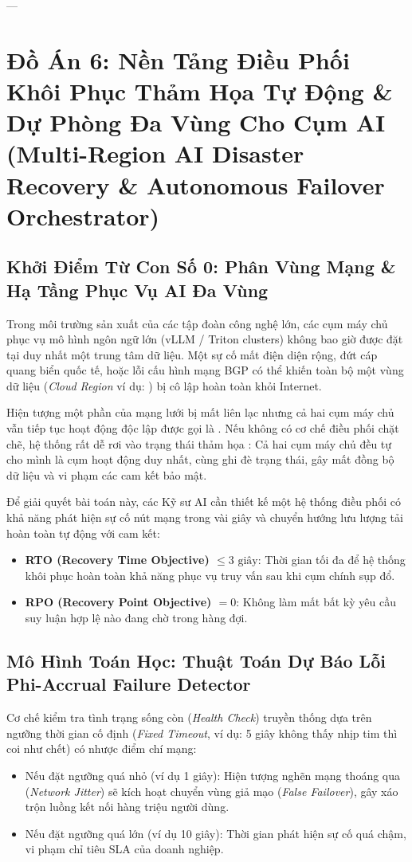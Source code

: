 ---

\section{Đồ Án 6: Nền Tảng Điều Phối Khôi Phục Thảm Họa Tự Động \& Dự Phòng Đa Vùng Cho Cụm AI (Multi-Region AI Disaster Recovery \& Autonomous Failover Orchestrator)}
\label{sec:workbook-multi-region-failover}

\subsection{Khởi Điểm Từ Con Số 0: Phân Vùng Mạng \& Hạ Tầng Phục Vụ AI Đa Vùng}
Trong môi trường sản xuất của các tập đoàn công nghệ lớn, các cụm máy chủ phục vụ mô hình ngôn ngữ lớn (vLLM / Triton clusters) không bao giờ được đặt tại duy nhất một trung tâm dữ liệu. Một sự cố mất điện diện rộng, đứt cáp quang biển quốc tế, hoặc lỗi cấu hình mạng BGP có thể khiến toàn bộ một vùng dữ liệu (\textit{Cloud Region} ví dụ: ) bị cô lập hoàn toàn khỏi Internet.

Hiện tượng một phần của mạng lưới bị mất liên lạc nhưng cả hai cụm máy chủ vẫn tiếp tục hoạt động độc lập được gọi là . Nếu không có cơ chế điều phối chặt chẽ, hệ thống rất dễ rơi vào trạng thái thảm họa : Cả hai cụm máy chủ đều tự cho mình là cụm hoạt động duy nhất, cùng ghi đè trạng thái, gây mất đồng bộ dữ liệu và vi phạm các cam kết bảo mật.

Để giải quyết bài toán này, các Kỹ sư AI cần thiết kế một hệ thống điều phối  có khả năng phát hiện sự cố nút mạng trong vài giây và chuyển hướng lưu lượng tải hoàn toàn tự động với cam kết:
\begin{itemize}
  \item \textbf{RTO (Recovery Time Objective) $\le 3\text{ giây}$}: Thời gian tối đa để hệ thống khôi phục hoàn toàn khả năng phục vụ truy vấn sau khi cụm chính sụp đổ.
  \item \textbf{RPO (Recovery Point Objective) $= 0$}: Không làm mất bất kỳ yêu cầu suy luận hợp lệ nào đang chờ trong hàng đợi.
\end{itemize}

\subsection{Mô Hình Toán Học: Thuật Toán Dự Báo Lỗi Phi-Accrual Failure Detector}
Cơ chế kiểm tra tình trạng sống còn (\textit{Health Check}) truyền thống dựa trên ngưỡng thời gian cố định (\textit{Fixed Timeout}, ví dụ: 5 giây không thấy nhịp tim thì coi như chết) có nhược điểm chí mạng:
\begin{itemize}
  \item Nếu đặt ngưỡng quá nhỏ (ví dụ 1 giây): Hiện tượng nghẽn mạng thoáng qua (\textit{Network Jitter}) sẽ kích hoạt chuyển vùng giả mạo (\textit{False Failover}), gây xáo trộn luồng kết nối hàng triệu người dùng.
  \item Nếu đặt ngưỡng quá lớn (ví dụ 10 giây): Thời gian phát hiện sự cố quá chậm, vi phạm chỉ tiêu SLA của doanh nghiệp.
\end{itemize}

